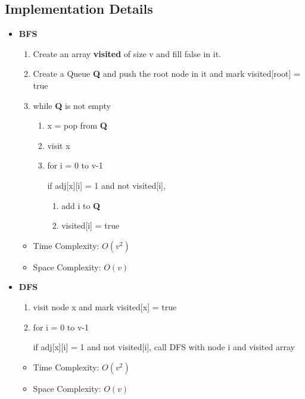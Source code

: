 \documentclass[11pt,a4paper]{article}
\begin{document}
\subsection{Implementation Details}\label{sec:details3}
\begin{itemize}
    \item \textbf{BFS}
    \begin{enumerate}
        \item Create an array \textbf{visited} of size v and fill false in it.
        \item Create a Queue \textbf{Q} and push the root node in it and mark visited[root] = true
        \item while \textbf{Q} is not empty
        \begin{enumerate}
            \item x = pop from \textbf{Q}
            \item visit x
            \item for i = 0 to v-1 
            
            if adj[x][i] = 1 and not visited[i],
            \begin{enumerate}
                \item  add i to \textbf{Q}
                \item visited[i] = true
            \end{enumerate}
        \end{enumerate}

    \end{enumerate}
    \begin{itemize}
        \item Time Complexity: $O(v^2)$
        \item Space Complexity: $O(v)$
    \end{itemize}
    
    \item \textbf{DFS}
    \begin{enumerate}
        \item visit node x and mark visited[x] = true
        \item for i = 0 to v-1
        
        if adj[x][i] = 1 and not visited[i], call DFS with node i and visited array
    \end{enumerate}
    \begin{itemize}
        \item Time Complexity: $O(v^2)$
        \item Space Complexity: $O(v)$
    \end{itemize}
\end{itemize}
\end{document}

